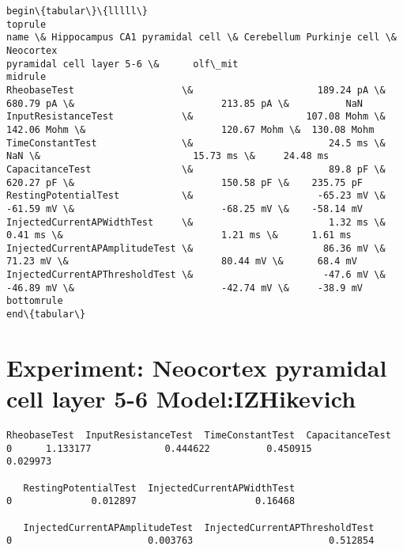         
    \begin{Verbatim}[commandchars=\\\{\}]
begin\{tabular\}\{lllll\}
toprule
name \& Hippocampus CA1 pyramidal cell \& Cerebellum Purkinje cell \& Neocortex
pyramidal cell layer 5-6 \&      olf\_mit 
midrule
RheobaseTest                   \&                      189.24 pA \&
680.79 pA \&                          213.85 pA \&          NaN 
InputResistanceTest            \&                    107.08 Mohm \&
142.06 Mohm \&                        120.67 Mohm \&  130.08 Mohm 
TimeConstantTest               \&                        24.5 ms \&
NaN \&                           15.73 ms \&     24.48 ms 
CapacitanceTest                \&                        89.8 pF \&
620.27 pF \&                          150.58 pF \&    235.75 pF 
RestingPotentialTest           \&                      -65.23 mV \&
-61.59 mV \&                          -68.25 mV \&    -58.14 mV 
InjectedCurrentAPWidthTest     \&                        1.32 ms \&
0.41 ms \&                            1.21 ms \&      1.61 ms 
InjectedCurrentAPAmplitudeTest \&                       86.36 mV \&
71.23 mV \&                           80.44 mV \&      68.4 mV 
InjectedCurrentAPThresholdTest \&                       -47.6 mV \&
-46.89 mV \&                          -42.74 mV \&     -38.9 mV 
bottomrule
end\{tabular\}

    \end{Verbatim}

    \hypertarget{experiment-neocortex-pyramidal-cell-layer-5-6-modelizhikevich}{%
\section{Experiment: Neocortex pyramidal cell layer 5-6
Model:IZHikevich}\label{experiment-neocortex-pyramidal-cell-layer-5-6-modelizhikevich}}

            \begin{tcolorbox}[breakable, size=fbox, boxrule=.5pt, pad at break*=1mm, opacityfill=0]
\begin{Verbatim}[commandchars=\\\{\}]
   RheobaseTest  InputResistanceTest  TimeConstantTest  CapacitanceTest  
0      1.133177             0.444622          0.450915         0.029973

   RestingPotentialTest  InjectedCurrentAPWidthTest  
0              0.012897                     0.16468

   InjectedCurrentAPAmplitudeTest  InjectedCurrentAPThresholdTest
0                        0.003763                        0.512854
\end{Verbatim}
\end{tcolorbox}
        
